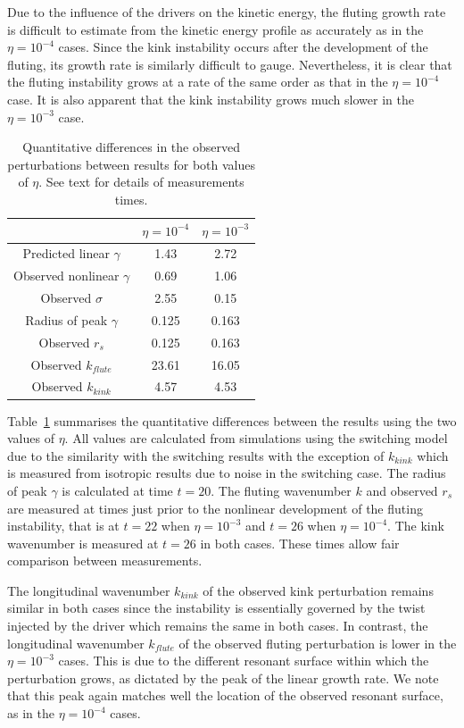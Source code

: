 Due to the influence of the drivers on the kinetic energy, the fluting growth rate is difficult to estimate from the kinetic energy profile as accurately as in the $\eta=10^{-4}$ cases. Since the kink instability occurs after the development of the fluting, its growth rate is similarly difficult to gauge. Nevertheless, it is clear that the fluting instability grows at a rate of the same order as that in the $\eta=10^{-4}$ case. It is also apparent that the kink instability grows much slower in the $\eta=10^{-3}$ case.

\begin{table}[]
\centering
\begin{tabular}{ccc}
&
$\eta=10^{-4}$ &
$\eta=10^{-3}$ \\
\midrule
Predicted linear $\gamma$ & 1.43 & 2.72  \\
Observed nonlinear $\gamma$ & 0.69 & 1.06  \\
Observed $\sigma$ & 2.55 & 0.15\\
\midrule
Radius of peak $\gamma$ & 0.125 & 0.163 \\
Observed $r_s$ & 0.125 & 0.163 \\
\midrule
Observed $k_{flute}$ & 23.61 & 16.05 \\
Observed $k_{kink}$ & 4.57 & 4.53 \\
\end{tabular}
\caption{Quantitative differences in the observed perturbations between results for both values of $\eta$. See text for details of measurements times.}
\label{tab:kink_fluting_params}
\end{table}

Table~\ref{tab:kink_fluting_params} summarises the quantitative differences between the results using the two values of $\eta$. All values are calculated from simulations using the switching model due to the similarity with the switching results with the exception of $k_{kink}$ which is measured from isotropic results due to noise in the switching case. The radius of peak $\gamma$ is calculated at time $t=20$. The fluting wavenumber $k$ and observed $r_s$ are measured at times just prior to the nonlinear development of the fluting instability, that is at $t=22$ when $\eta=10^{-3}$ and $t=26$ when $\eta = 10^{-4}$. The kink wavenumber is measured at $t=26$ in both cases. These times allow fair comparison between measurements.

The longitudinal wavenumber $k_{kink}$ of the observed kink perturbation remains similar in both cases since the instability is essentially governed by the twist injected by the driver which remains the same in both cases. In contrast, the longitudinal wavenumber $k_{flute}$ of the observed fluting perturbation is lower in the $\eta=10^{-3}$ cases. This is due to the different resonant surface within which the perturbation grows, as dictated by the peak of the linear growth rate. We note that this peak again matches well the location of the observed resonant surface, as in the $\eta=10^{-4}$ cases.

